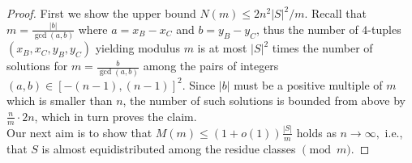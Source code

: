 \documentclass[10pt,a4paper]{amsart}
\begin{document}
\begin{proof}
	First we show the upper bound $N(m)\le 2n^2|S|^2/m$. Recall that $m=\frac{|b|}{\gcd(a,b)}$ where $a=x_B-x_C$ and $ b=y_B-y_C $, thus the number of $4$-tuples $(x_B, x_C, y_B, y_C)$ yielding modulus $m$ is at most $|S|^2$ times the number of solutions for $m=\frac{b}{\gcd(a,b)}$ among the pairs of integers $(a,b)\in [-(n-1), (n-1)]^2$. Since $|b|$ must be a positive multiple of $m$ which is smaller than $n$, the number of such solutions is bounded from above by $\frac{n}{m}\cdot 2n$, which in turn proves the claim.\\
	Our next aim is to show that $M(m)\leq (1+o(1))\frac{|S|}{m}$ holds as $n\to \infty,$ i.e., that $S$ is almost equidistributed among the residue classes $\pmod m.$
	
	\end{proof}
\end{document}
